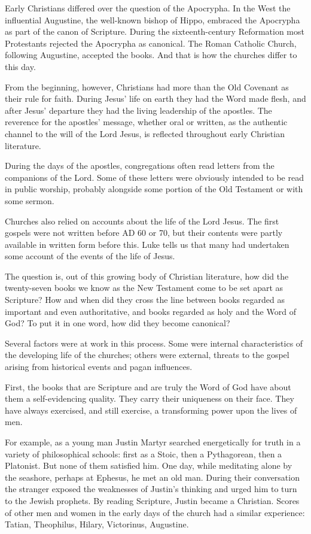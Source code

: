 Early Christians differed over the question of the Apocrypha. In the West the influential Augustine,
the well-known bishop of Hippo, embraced the Apocrypha as part of the canon of Scripture. During the
sixteenth-century Reformation most Protestants rejected the Apocrypha as canonical. The Roman
Catholic Church, following Augustine, accepted the books. And that is how the churches differ to
this day.

From the beginning, however, Christians had more than the Old Covenant as their rule for faith.
During Jesus’ life on earth they had the Word made flesh, and after Jesus’ departure they had the
living leadership of the apostles. The reverence for the apostles’ message, whether oral or written,
as the authentic channel to the will of the Lord Jesus, is reflected throughout early Christian
literature.

During the days of the apostles, congregations often read letters from the companions of the Lord.
Some of these letters were obviously intended to be read in public worship, probably alongside some
portion of the Old Testament or with some sermon.

Churches also relied on accounts about the life of the Lord Jesus. The first gospels were not
written before AD 60 or 70, but their contents were partly available in written form before this.
Luke tells us that many had undertaken some account of the events of the life of Jesus.

The question is, out of this growing body of Christian literature, how did the twenty-seven books we
know as the New Testament come to be set apart as Scripture? How and when did they cross the line
between books regarded as important and even authoritative, and books regarded as holy and the Word
of God? To put it in one word, how did they become canonical?

Several factors were at work in this process. Some were internal characteristics of the developing
life of the churches; others were external, threats to the gospel arising from historical events and
pagan influences.

First, the books that are Scripture and are truly the Word of God have about them a self-evidencing
quality. They carry their uniqueness on their face. They have always exercised, and still exercise,
a transforming power upon the lives of men.

For example, as a young man Justin Martyr searched energetically for truth in a variety of
philosophical schools: first as a Stoic, then a Pythagorean, then a Platonist. But none of them
satisfied him. One day, while meditating alone by the seashore, perhaps at Ephesus, he met an old
man. During their conversation the stranger exposed the weaknesses of Justin’s thinking and urged
him to turn to the Jewish prophets. By reading Scripture, Justin became a Christian. Scores of other
men and women in the early days of the church had a similar experience: Tatian, Theophilus, Hilary,
Victorinus, Augustine.

